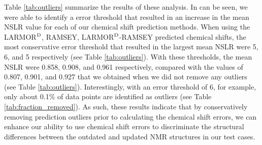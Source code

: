 \documentclass[fleqn,10pt]{wlscirep}
\begin{document}
Table \ref{tab:outliers} summarize the results of these analysis. In can be seen, we were able to identify a error threshold that resulted in an increase in the mean NSLR value for each of our chemical shift prediction methods. When using the LARMOR$^{\rm D}$, RAMSEY, LARMOR$^{\rm D}$-RAMSEY predicted chemical shifts, the most conservative error threshold that resulted in the largest mean NSLR were 5,  6, and 5 respectively (see Table \ref{tab:outliers}).  With these thresholds, the mean NSLR were 0.858,  0.908, and 0.961 respectively, compared with the values of  0.807, 0.901, and 0.927 that we obtained when we did not remove any outliers (see Table \ref{tab:outliers}). Interestingly, with an error threshold of 6, for example, only about 0.1\% of data points are identified as outliers (see Table \ref{tab:fraction_removed}). As such, these results indicate that by conservatively removing prediction outliers prior to calculating the chemical shift errors, we can enhance our ability to use chemical shift errors to discriminate the structural differences between the outdated and updated NMR structures in our test cases.
\end{document}
